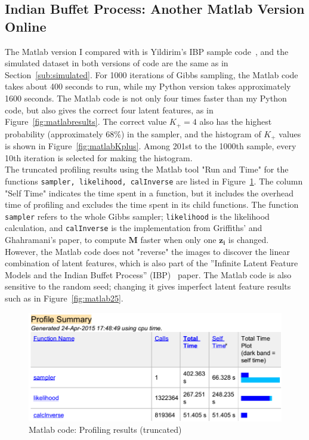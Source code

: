 \subsection{Indian Buffet Process: Another Matlab Version Online}

The Matlab version I compared with is Yildirim's IBP sample code~\cite{ibp2012code}, and the simulated dataset in both versions of code are the same as in Section~\ref{sub:simulated}. For 1000 iterations of Gibbs sampling, the Matlab code takes about 400 seconds to run, while my Python version takes approximately 1600 seconds. The Matlab code is not only four times faster than my Python code, but also gives the correct four latent features, as in Figure~\ref{fig:matlabresults}. The correct value $K_+ = 4$ also has the highest probability (approximately 68\%) in the sampler, and the histogram of $K_+$ values is shown in Figure~\ref{fig:matlabKplus}. Among 201st to the 1000th sample, every 10th iteration is selected for making the histogram. \\

The truncated profiling results using the Matlab tool "Run and Time" for the functions \texttt{sampler, likelihood, calInverse} are listed in Figure~\ref{fig:ibp2012matlab}. The column "Self Time" indicates the time spent in a function, but it includes the overhead time of profiling and excludes the time spent in its child functions. The function \texttt{sampler} refers to the whole Gibbs sampler; \texttt{likelihood} is the likelihood calculation, and \texttt{calInverse} is the implementation from Griffiths' and Ghahramani's paper\cite{griffiths2005detailed}, to compute $\mathbf{M}$ faster when only one $\mathbf{z_i}$ is changed.\\

However, the Matlab code does not "reverse" the images to discover the linear combination of latent features, which is also part of the ''Infinite Latent Feature Models and the Indian Buffet Process'' (IBP)~\cite{griffiths2005infinite} paper. The Matlab code is also sensitive to the random seed; changing it gives imperfect latent feature results such as in Figure~\ref{fig:matlab25}.

\begin{figure}[!ht]
\centering
    \includegraphics[width=0.8\linewidth]{IBP_MATLABcode/matlab_code_profiling_summary.png}
    \caption{Matlab code: Profiling results (truncated)}
    \label{fig:ibp2012matlab}
\end{figure}

